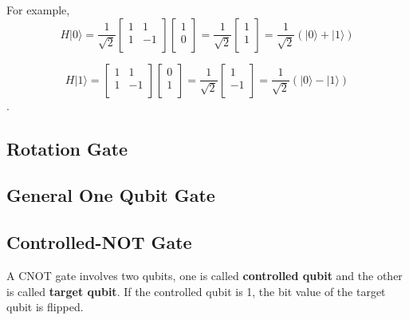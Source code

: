 For example,
\begin{equation}
H|0\rangle = \frac{1}{\sqrt{2}}\begin{bmatrix}
1 & 1\\
1 & -1 \\
\end{bmatrix}\left[
\begin{array}{c}
1 \\
0 \\
\end{array}
\right]
= \frac{1}{\sqrt{2}} \left[
\begin{array}{c}
1 \\
1 \\
\end{array}
\right]
= \frac{1}{\sqrt{2}} (|0\rangle + |1\rangle)
\end{equation}

\begin{equation}
H|1\rangle = \begin{bmatrix}
1 & 1\\
1 & -1 \\
\end{bmatrix} 
\left[
\begin{array}{c}
0 \\
1  \\
\end{array}
\right]
= \frac{1}{\sqrt{2}} \left[
\begin{array}{c}
1 \\
-1 \\
\end{array}
\right]
=\frac{1}{\sqrt{2}} (|0\rangle - |1\rangle)
\end{equation}.

\subsection{Rotation Gate}
\subsection{General One Qubit Gate}

\subsection{Controlled-NOT Gate}
A CNOT gate involves two qubits, one is called \textbf{controlled qubit} and the other is called \textbf{target qubit}.  If the controlled qubit is 1, the bit value of the target qubit is flipped.

